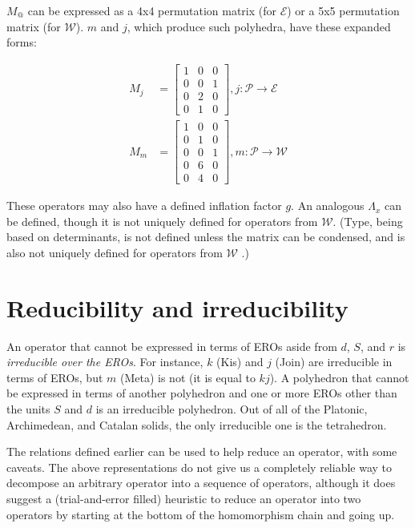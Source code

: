 \documentclass{amsart}[12pt]
\begin{document}
$M_@$ can be expressed as a 4x4 permutation matrix (for $\mathcal{E}$)
or a 5x5 permutation matrix (for $\mathcal{W}$). $m$ and $j$,
which produce such polyhedra, have these expanded forms:

\begin{equation}
  \begin{split}
  M_j &= \begin{bmatrix}
  1 & 0 & 0 \\
  0 & 0 & 1 \\
  0 & 2 & 0 \\
  0 & 1 & 0 \end{bmatrix}, j: \mathcal{P} \to \mathcal{E} \\
  M_m &= \begin{bmatrix}
  1 & 0 & 0 \\
  0 & 1 & 0 \\
  0 & 0 & 1 \\
  0 & 6 & 0 \\
  0 & 4 & 0 \end{bmatrix}, m: \mathcal{P} \to \mathcal{W}
  \end{split}
\end{equation}

These operators may also have a defined inflation factor $g$.
An analogous $\Lambda_x$ can be defined, though it is not uniquely
defined for operators from $\mathcal{W}$. (Type, being based on determinants,
is not defined unless the matrix can be condensed,
and is also not uniquely defined for operators from $\mathcal{W}$ .)

\section{Reducibility and irreducibility}
An operator that cannot be expressed in terms of EROs aside from $d$, $S$, and
$r$ is \textit{irreducible over the EROs}. For instance, $k$ (Kis) and $j$
(Join) are irreducible in terms of EROs, but $m$ (Meta) is not (it is equal to
$kj$). A polyhedron that cannot be expressed in terms of another polyhedron and
one or more EROs other than the units $S$ and $d$ is an irreducible polyhedron.
Out of all of the Platonic, Archimedean, and Catalan solids, the only
irreducible one is the tetrahedron.

The relations defined earlier can be used to help reduce an operator,
with some caveats. The above representations do not give us a completely
reliable way to decompose an arbitrary operator into a sequence of operators,
although it does suggest a (trial-and-error filled) heuristic to reduce an
operator into two operators by starting at the bottom of the homomorphism chain
and going up.
\end{document}
